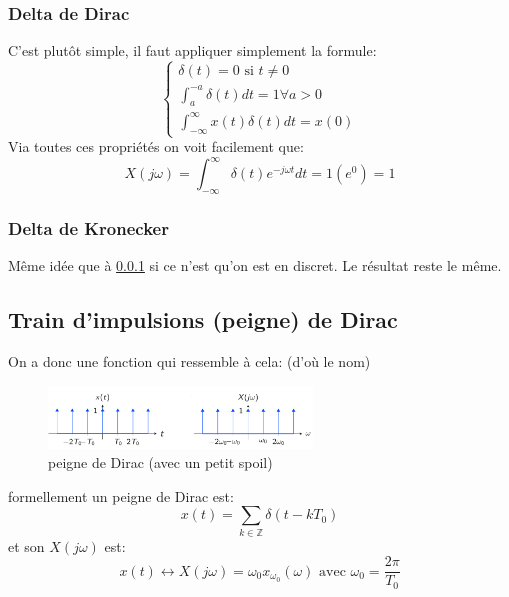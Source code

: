 \documentclass{report}
\begin{document}
\subsubsection{Delta de Dirac} \label{Dirac}
C'est plutôt simple, il faut appliquer simplement la formule:
\begin{equation}
\begin{cases}
\delta(t) = 0 \text{ si } t \neq 0\\
\int_a^{-a} \delta(t) dt = 1 \forall a > 0\\
\int_{-\infty}^{\infty} x(t) \delta(t) dt = x(0)
\end{cases}
\end{equation}
Via toutes ces propriétés on voit facilement que:
\begin{equation}
X(j\omega) = \int_{-\infty}^{\infty} \delta(t) e^{-j \omega t} dt = 1(e^0) = 1
\end{equation}

\subsubsection{Delta de Kronecker}
Même idée que à \ref{Dirac} si ce n'est qu'on est en discret. Le résultat reste le même.

\subsection{Train d'impulsions (peigne) de Dirac}
On a donc une fonction qui ressemble à cela: (d'où le nom)
\begin{figure}[H]
\centering
\includegraphics[width=7cm]{img/peigne.png}
\caption{peigne de Dirac (avec un petit spoil)}
\end{figure}
formellement un peigne de Dirac est:
\begin{equation}
x(t) = \sum_{k \in \mathbb{Z}} \delta(t-kT_0)
\end{equation}
et son $X(j\omega)$ est:
\begin{equation}
x(t) \longleftrightarrow X(j\omega) = \omega_0 x_{\omega_0} (\omega) \text{ avec } \omega_0 = \frac{2\pi}{T_0}
\end{equation}
\end{document}
